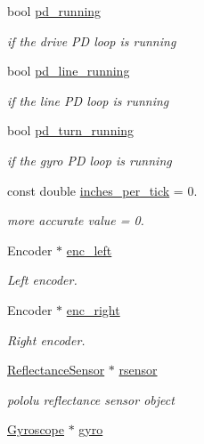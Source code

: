 \begin{DoxyCompactItemize}
bool \hyperlink{class_drive_train_a24c0d92ca340c9afda1544f6ab67ea11}{pd\+\_\+running}
\begin{DoxyCompactList}\small\item\em if the drive PD loop is running \end{DoxyCompactList}\item 
bool \hyperlink{class_drive_train_aaf576007439966ed66f0d91a2121a332}{pd\+\_\+line\+\_\+running}
\begin{DoxyCompactList}\small\item\em if the line PD loop is running \end{DoxyCompactList}\item 
bool \hyperlink{class_drive_train_afc2305d5c7646a92d9875973ff2f7e67}{pd\+\_\+turn\+\_\+running}
\begin{DoxyCompactList}\small\item\em if the gyro PD loop is running \end{DoxyCompactList}\item 
const double \hyperlink{class_drive_train_adc3896c625d516e91add67eedb525440}{inches\+\_\+per\+\_\+tick} = 0.
\begin{DoxyCompactList}\small\item\em more accurate value = 0. \end{DoxyCompactList}\item 
Encoder $\ast$ \hyperlink{class_drive_train_ab0a54aaa4484970b6890a7c8ebaadf3b}{enc\+\_\+left}
\begin{DoxyCompactList}\small\item\em Left encoder. \end{DoxyCompactList}\item 
Encoder $\ast$ \hyperlink{class_drive_train_aea08b3ba330e27f19b5658446e7cf51a}{enc\+\_\+right}
\begin{DoxyCompactList}\small\item\em Right encoder. \end{DoxyCompactList}\item 
\hyperlink{class_reflectance_sensor}{Reflectance\+Sensor} $\ast$ \hyperlink{class_drive_train_a90f1f3d3f42a0ac4082df8e37541b71f}{rsensor}
\begin{DoxyCompactList}\small\item\em pololu reflectance sensor object \end{DoxyCompactList}\item 
\hyperlink{class_gyroscope}{Gyroscope} $\ast$ \hyperlink{class_drive_train_a7fca76321e3bf08c0bcdc645b9e70b1d}{gyro}

\end{DoxyCompactItemize}
